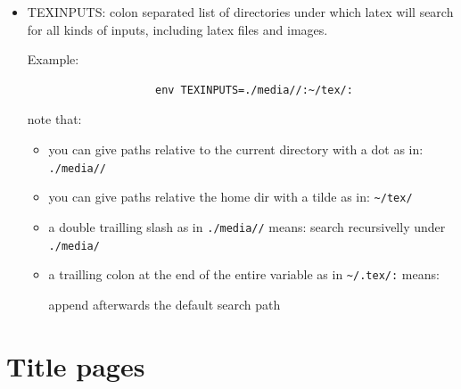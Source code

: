 \documentclass[12pt]{article}
\begin{document}
        \begin{itemize}
            \item TEXINPUTS: colon separated list of directories under which latex will search for all kinds of inputs,
                including latex files and images.

                Example:

                \begin{lstlisting}
                    env TEXINPUTS=./media//:~/tex/:
                \end{lstlisting}

                note that:

                \begin{itemize}

                    \item you can give paths relative to the current directory with a dot as in: \lstinline|./media//|

                    \item you can give paths relative the home dir with a tilde as in: \lstinline|~/tex/|

                    \item a double trailling slash as in \lstinline|./media//| means: search recursivelly under \lstinline|./media/|

                    \item a trailling colon at the end of the entire variable as in \lstinline|~/.tex/:| means:

                        append afterwards the default search path
                \end{itemize}
        \end{itemize}

\section{Title pages} \label{title-pages}

    \maketitle
    \newpage
\end{document}
